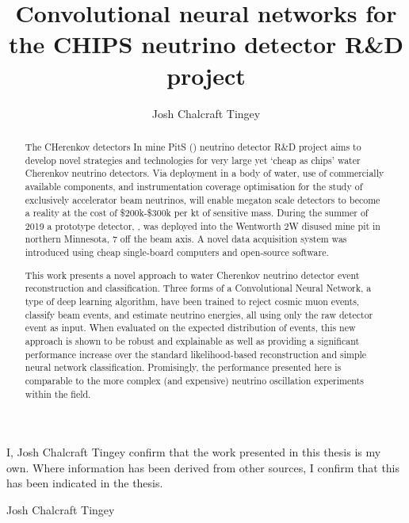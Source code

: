 
\title{Convolutional neural networks for the CHIPS neutrino detector R\&D project}
\author{Josh Chalcraft Tingey}

\thispagestyle{plain}

\begin{declaration} %
    I, Josh Chalcraft Tingey confirm that the work presented in this thesis is my own. Where
    information has been derived from other sources, I confirm that this has been indicated in the
    thesis.
    \vspace*{1cm}
    \begin{flushright}
        Josh Chalcraft Tingey
    \end{flushright}
\end{declaration}

\begin{abstract} %
    The CHerenkov detectors In mine PitS (\chips) neutrino detector R\&D project aims to develop
    novel strategies and technologies for very large yet `cheap as chips' water Cherenkov neutrino
    detectors. Via deployment in a body of water, use of commercially available components, and
    instrumentation coverage optimisation for the study of exclusively accelerator beam neutrinos,
    \chips will enable megaton scale detectors to become a reality at the cost of \$200k-\$300k
    per kt of sensitive mass. During the summer of 2019 a prototype \chips detector, \chipsfive,
    was deployed into the Wentworth 2W disused mine pit in northern Minnesota, \SI{7}{}
    off the \numi beam axis. A novel data acquisition system was introduced using cheap
    single-board computers and open-source software.

    This work presents a novel approach to water Cherenkov neutrino detector event reconstruction
    and classification. Three forms of a Convolutional Neural Network, a type of deep learning
    algorithm, have been trained to reject cosmic muon events, classify beam events, and estimate
    neutrino energies, all using only the raw detector event as input. When evaluated on the
    expected distribution of \chipsfive events, this new approach is shown to be robust and
    explainable as well as providing a significant performance increase over the standard
    likelihood-based reconstruction and simple neural network classification. Promisingly, the
    performance presented here is comparable to the more complex (and expensive) neutrino
    oscillation experiments within the field.
\end{abstract}

